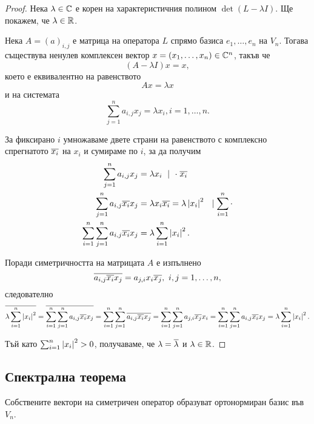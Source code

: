 \documentclass[numbers=endperiod, DIV=15, bibliography=totocnumbered]{scrartcl}
\begin{document}
\begin{proof}
  Нека $\lambda \in \mathbb{C}$ е корен на характеристичния полином $\det(L - \lambda I)$. Ще покажем, че $\lambda \in \mathbb{R}$.

  Нека $A = {(a)}_{i,j}$ е матрица на оператора $L$ спрямо базиса $e_1, \ldots, e_n$ на $V_n$. Тогава съществува ненулев комплексен вектор $x = (x_1, \ldots, x_n) \in \mathbb{C}^n$, такъв че
  \begin{displaymath}
    (A - \lambda I) x = x,
  \end{displaymath}
  което е еквивалентно на равенството
  \begin{displaymath}
    A x = \lambda x
  \end{displaymath}
  и на системата
  \begin{displaymath}
    \sum_{j=1}^n a_{i,j} x_j = \lambda x_i, i = 1, \ldots, n.
  \end{displaymath}

  За фиксирано $i$ умножаваме двете страни на равенството с комплексно спрегнатото $\overline{x_i}$ на $x_i$ и сумираме по $i$, за да получим
  \begin{align*}
    \sum_{j=1}^n a_{i,j} x_j
    &=
    \lambda x_i~\mid~\cdot \; \overline{x_i}
    \\
    \sum_{j=1}^n a_{i,j} \overline{x_i} x_j
    &=
    \lambda x_i \overline{x_i} = \lambda \left\vert x_i \right\vert^2~~\mid \sum_{i=1}^n \cdot
    \\
    \sum_{i=1}^n \sum_{j=1}^n a_{i,j} \overline{x_i} x_j
    &=
    \lambda \sum_{i=1}^n \left\vert x_i \right\vert^2.
  \end{align*}

  Поради симетричността на матрицата $A$ е изпълнено
  \begin{displaymath}
    \overline{a_{i,j} \overline{x_i} x_j}
    =
    a_{j,i} x_i \overline{x_j},~i, j = 1, \ldots, n,
  \end{displaymath}
  следователно
  \begin{displaymath}
    \overline{\lambda \sum_{i=1}^n \left\vert x_i \right\vert^2}
    =
    \overline{\sum_{i=1}^n \sum_{j=1}^n a_{i,j} \overline{x_i} x_j}
    =
    \sum_{i=1}^n \sum_{j=1}^n \overline{a_{i,j} \overline{x_i} x_j}
    =
    \sum_{i=1}^n \sum_{j=1}^n a_{j,i} \overline{x_j} x_i
    =
    \sum_{i=1}^n \sum_{j=1}^n a_{i,j} \overline{x_i} x_j
    =
    \lambda \sum_{i=1}^n \left\vert x_i \right\vert^2.
  \end{displaymath}

  Тъй като $\sum_{i=1}^n \left\vert x_i \right\vert^2 > 0$, получаваме, че $\lambda = \overline{\lambda}$ и $\lambda \in \mathbb{R}$.
\end{proof}

\subsection{Спектрална теорема}

\begin{theorem}
  Собствените вектори на симетричен оператор образуват ортонормиран базис във $V_n$.
\end{theorem}

\printbibliography
\end{document}
